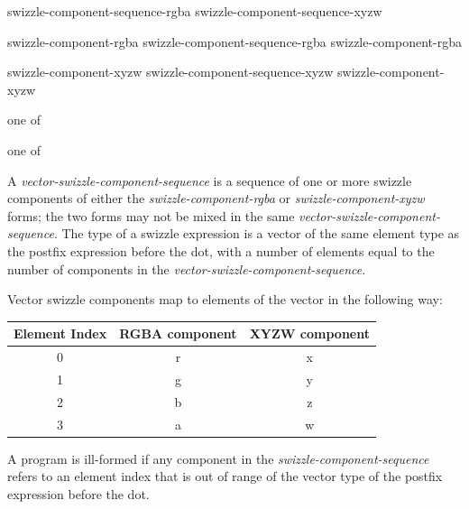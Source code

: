 
\begin{grammar}
  \br
  swizzle-component-sequence-rgba\br
  swizzle-component-sequence-xyzw\br

  \br
  swizzle-component-rgba\br
  swizzle-component-sequence-rgba swizzle-component-rgba\br

  \br
  swizzle-component-xyzw\br
  swizzle-component-sequence-xyzw swizzle-component-xyzw\br

   \textnormal{one of}\br
  \br

   \textnormal{one of}\br
\end{grammar}

\p A \textit{vector-swizzle-component-sequence} is a sequence of one or more
swizzle components of either the \textit{swizzle-component-rgba} or
\textit{swizzle-component-xyzw} forms; the two forms may not be mixed in the
same \textit{vector-swizzle-component-sequence}. The type of a swizzle
expression is a vector of the same element type as the postfix expression before
the dot, with a number of elements equal to the number of components in the
\textit{vector-swizzle-component-sequence}.

\p Vector swizzle components map to elements of the vector in the following way:

\begin{center}
  \begin{tabular}{|| c | c | c ||}
    \hline
    Element Index & RGBA component & XYZW component \\
    \hline
    0 & r & x \\
    1 & g & y \\
    2 & b & z \\
    3 & a & w \\
    \hline
  \end{tabular}
\end{center}

\p A program is ill-formed if any component in the
\textit{swizzle-component-sequence} refers to an element index that is out of
range of the vector type of the postfix expression before the dot.

